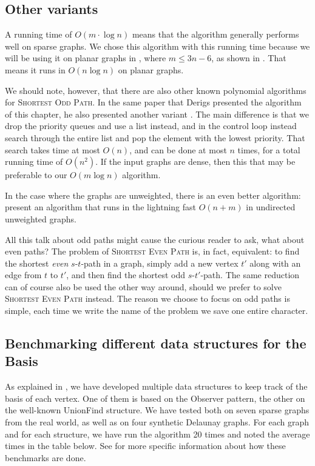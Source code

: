 \subsection{Other variants}
A running time of $O(m \cdot \log n)$ means that the algorithm generally performs well on sparse graphs. We chose this algorithm with this running time because we will be using it on planar graphs in , where $m \leq 3n-6$, as shown in . That means it runs in $O(n \log n)$ on planar graphs.

We should note, however, that there are also other known polynomial algorithms for \textsc{Shortest Odd Path}. In the same paper that Derigs presented the algorithm of this chapter, he also presented another variant \cite{source:derigs_shortest_odd_path}. The main difference is that we drop the priority queues and use a list instead, and in the control loop instead search through the entire list and pop the element with the lowest priority. That search takes time at most $O(n)$, and can be done at most $n$ times, for a total running time of $O(n^2)$. If the input graphs are dense, then this that may be preferable to our $O(m \log n)$ algorithm.

In the case where the graphs are unweighted, there is an even better algorithm: \cite{source:the-even-path-problem-for-graphs-and-digraphs} present an algorithm that runs in the lightning fast $O(n + m)$ in undirected unweighted graphs.

All this talk about odd paths might cause the curious reader to ask, what about even paths? The problem of \textsc{Shortest Even Path} is, in fact, equivalent: to find the shortest \emph{even} $s$-$t$-path in a graph, simply add a new vertex $t'$ along with an edge from $t$ to $t'$, and then find the shortest odd $s$-$t'$-path. The same reduction can of course also be used the other way around, should we prefer to solve \textsc{Shortest Even Path} instead. The reason we choose to focus on odd paths is simple, each time we write the name of the problem we save one entire character.

\subsection{Benchmarking different data structures for the Basis}
\label{subsubsection:testing-basis}
As explained in , we have developed multiple data structures to keep track of the basis of each vertex. One of them is based on the Observer pattern, the other on the well-known UnionFind structure. We have tested both on seven sparse graphs from the real world, as well as on four synthetic Delaunay graphs. For each graph and for each structure, we have run the algorithm 20 times and noted the average times in the table below. See  for more specific information about how these benchmarks are done.

